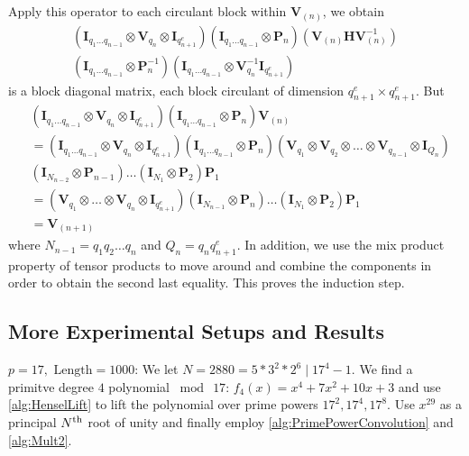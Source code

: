 \begin{ext_proof}
    Apply this operator to each circulant block within \(\bm{V}_{(n)}\), we obtain
    \begin{multline*}
        \left(\bm{I}_{q_1\ldots q_{n-1}} \otimes \bm{V}_{q_n} \otimes \bm{I}_{q_{n+1}^e}\right) \left(\bm{I}_{q_1\ldots q_{n-1}} \otimes \bm{P}_n\right) \left(\bm{V}_{(n)} \bm{H} \bm{V}_{(n)}^{-1}\right) \\
        \left(\bm{I}_{q_1\ldots q_{n-1}} \otimes \bm{P}_n^{-1}\right) \left(\bm{I}_{q_1\ldots q_{n-1}} \otimes \bm{V}_{q_n}^{-1} \bm{I}_{q_{n+1}^e}\right)
    \end{multline*}
    is a block diagonal matrix, each block circulant of dimension \(q_{n+1}^e \times q_{n+1}^e\). But
    \begin{align*}
        &\left(\bm{I}_{q_1\ldots q_{n-1}} \otimes \bm{V}_{q_n} \otimes \bm{I}_{q_{n+1}^e}\right) \left(\bm{I}_{q_1\ldots q_{n-1}} \otimes \bm{P}_n\right) \bm{V}_{(n)} \\
        &= \left(\bm{I}_{q_1\ldots q_{n-1}} \otimes \bm{V}_{q_n} \otimes \bm{I}_{q_{n+1}^e}\right) \left(\bm{I}_{q_1\ldots q_{n-1}} \otimes \bm{P}_n\right) \left(\bm{V}_{q_1} \otimes \bm{V}_{q_2} \otimes \ldots \otimes \bm{V}_{q_{n-1}} \otimes \bm{I}_{Q_n}\right) \\
        &\left(\bm{I}_{N_{n-2}} \otimes \bm{P}_{n-1}\right) \dots \left(\bm{I}_{N_1} \otimes \bm{P}_2\right) \bm{P}_1 \\
        &= \left(\bm{V}_{q_1} \otimes \ldots \otimes \bm{V}_{q_{n}} \otimes \bm{I}_{q_{n+1}^e}\right) \left(\bm{I}_{N_{n-1}} \otimes \bm{P}_n\right) \dots \left(\bm{I}_{N_1} \otimes \bm{P}_2\right) \bm{P}_1 \\
        &= \bm{V}_{(n+1)}
    \end{align*}
    where \(N_{n-1} = q_1 q_2 \ldots q_n\) and \(Q_n = q_n q_{n+1}^e\). In addition, we use the mix product property of tensor products to move around and combine the components in order to obtain the second last equality. This proves the induction step.
\end{ext_proof}

\subsection{More Experimental Setups and Results} \label{subsection:more_experiments}
{\bf \(p = 17, \text{ Length} = 1000\)}: We let \(N = 2880 = 5 * 3^2 * 2^6 \mid 17^{4} - 1\). We find a primitve degree \(4\) polynomial \(\bmod \  17\): \(f_{4}(x) = x^4 + 7x^2 + 10x + 3\) and use \cref{alg:HenselLift} to lift the polynomial over prime powers \(17^2, 17^4, 17^8\). Use \(x^{29} \) as a principal \(N\textsuperscript{th}\) root of unity and finally employ \cref{alg:PrimePowerConvolution} and \cref{alg:Mult2}.

